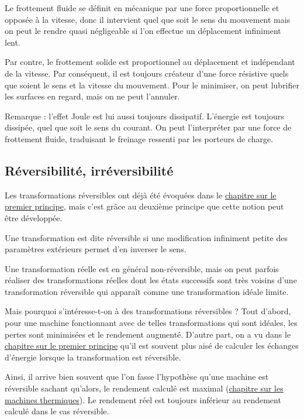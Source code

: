 Le frottement fluide se définit en mécanique par une force proportionnelle et opposée à la vitesse, donc il intervient quel que soit le sens du mouvement mais on peut le rendre quasi négligeable si l'on effectue un déplacement infiniment lent.

Par contre, le frottement solide est proportionnel au déplacement et indépendant de la vitesse. Par conséquent, il est toujours créateur d'une force résistive quels que soient le sens et la vitesse du mouvement. Pour le minimiser, on peut lubrifier les surfaces en regard, mais on ne peut l'annuler.

Remarque : l'effet Joule est lui aussi toujours dissipatif. L'énergie est toujours dissipée, quel que soit le sens du courant. On peut l'interpréter par une force de frottement fluide, traduisant le freinage ressenti par les porteurs de charge.

\subsection{Réversibilité, irréversibilité}

Les transformations réversibles ont déjà été évoquées dans le \hyperref[chap:premierPrincipe]{chapitre sur le premier principe}, mais c'est grâce au deuxième principe que cette notion peut être développée.

Une transformation est dite réversible si une modification infiniment petite des paramètres extérieurs permet d'en inverser le sens.

Une transformation réelle est en général non-réversible, mais on peut parfois réaliser des transformations réelles dont les états successifs sont très voisins d'une transformation réversible qui apparaît comme une transformation idéale limite.

Mais pourquoi s'intéresse-t-on à des transformations réversibles ? Tout d'abord, pour une machine fonctionnant avec de telles transformations qui sont idéales, les pertes sont minimisées et le rendement augmenté. D'autre part, on a vu dans le \hyperref[chap:premierPrincipe]{chapitre sur le premier principe} qu'il est souvent plus aisé de calculer les échanges d'énergie lorsque la transformation est réversible.

Ainsi, il arrive bien souvent que l'on fasse l'hypothèse qu'une machine est réversible sachant qu'alors, le rendement calculé est maximal (\cf \hyperref[chap:machinesThermiques]{chapitre sur les machines thermiques}). Le rendement réel est toujours inférieur au rendement calculé dans le cas réversible.

